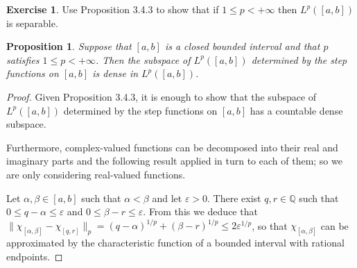 \documentclass[11pt,a4paper,twoside]{article}
\theoremstyle{definition}
\newcounter{excounter}
\newtheorem{exercise}[excounter]{Exercise}
\theoremstyle{plain}
\newtheorem{proposition}{Proposition}[subsection]
\begin{document}
\begin{exercise}

  Use Proposition 3.4.3 to show that if $1 \leq p < +\infty$ then $L^p ( [ a, b ] )$ is separable.

\end{exercise}

\begin{proposition}

  Suppose that $[ a, b ]$ is a closed bounded interval and that $p$ satisfies $1 \leq p < +\infty$.
  Then the subspace of $L^p ( [ a, b ])$ determined by the step functions on $[ a, b ]$ is dense in $L^p ( [ a, b ] )$.

\end{proposition}

\begin{proof}

  Given Proposition 3.4.3, it is enough to show that the subspace of $L^p ( [ a, b ] )$ determined by the step functions on $[ a, b ]$
  has a countable dense subspace.

  Furthermore, complex-valued functions can be decomposed into their real and imaginary parts and the following result applied in turn to
  each of them; so we are only considering real-valued functions.

  Let $\alpha, \beta \in [ a, b ]$ such that $\alpha < \beta$ and let $\varepsilon > 0$.
  There exist $q, r \in \mathbb{Q}$ such that $0 \leq q - \alpha \leq \varepsilon$ and $0 \leq \beta - r \leq \varepsilon$.
  From this we deduce that $\| \chi_{[ \alpha, \beta ]} - \chi_{[ q, r ]} \|_p = ( q - \alpha )^{1 / p} + ( \beta - r )^{1 / p} \leq 2 \varepsilon^{1 / p}$, so that $\chi_{[ \alpha, \beta ]}$
  can be approximated by the characteristic function of a bounded interval with rational endpoints.


\end{proof}
\end{document}
